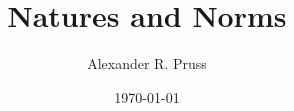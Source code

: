 \def\book{}



\title{Natures and Norms}
\author{Alexander R. Pruss}
\date{\today}


\maketitle

\setcounter{secnumdepth}{4}
\setcounter{tocdepth}{4}
\tableofcontents





\printbibliography

